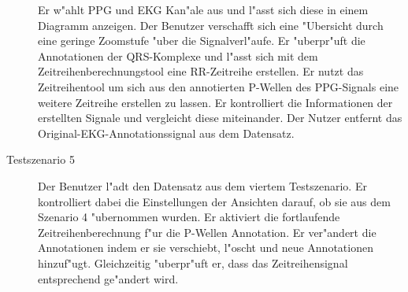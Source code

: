 \begin{description}
					  Er w"ahlt \ac{PPG} und \ac{EKG} Kan"ale aus und l"asst sich diese in einem Diagramm anzeigen.
					  Der Benutzer verschafft sich eine "Ubersicht durch eine geringe Zoomstufe "uber die Signalverl"aufe.
					  Er "uberpr"uft die Annotationen der QRS-Komplexe und l"asst sich mit dem Zeitreihenberechnungstool eine RR-Zeitreihe erstellen.
					  Er nutzt das Zeitreihentool um sich aus den annotierten P-Wellen des \ac{PPG}-Signals eine weitere Zeitreihe erstellen zu lassen.
					  Er kontrolliert die Informationen der erstellten Signale und vergleicht diese miteinander.
					  Der Nutzer entfernt das Original-\ac{EKG}-Annotationssignal aus dem Datensatz.
\item[Testszenario 5] Der Benutzer l"adt den Datensatz aus dem viertem Testszenario.
					  Er kontrolliert dabei die Einstellungen der Ansichten darauf, ob sie aus dem Szenario 4 "ubernommen wurden.
					  Er aktiviert die fortlaufende Zeitreihenberechnung f"ur die P-Wellen Annotation.
					  Er ver"andert die Annotationen indem er sie verschiebt, l"oscht und neue Annotationen hinzuf"ugt.
					  Gleichzeitig "uberpr"uft er, dass das Zeitreihensignal entsprechend ge"andert wird.
\end{description}

